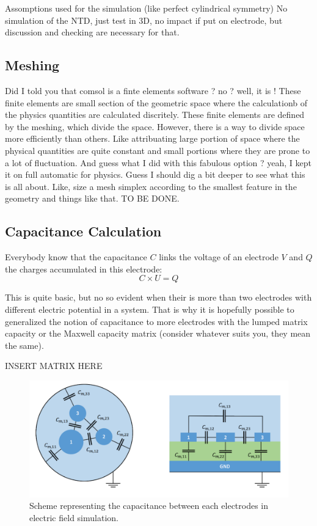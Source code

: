 Assomptions used for the simulation (like perfect cylindrical symmetry)
No simulation of the NTD, just test in 3D, no impact if put on electrode, but discussion and checking are necessary for that.

\subsection{Meshing}

Did I told you that comsol is a finte elements software ? no ? well, it is !
These finite elements are small section of the geometric space where the calculationb of the physics quantities are calculated discritely. These finite elements are defined by the meshing, which divide the space. However, there is a way to divide space more efficiently than others. Like attribuating large portion of space where the physical quantities are quite constant and small portions where they are prone to a lot of fluctuation.
And guess what I did with this fabulous option ?
yeah, I kept it on full automatic for physics. Guess I should dig a bit deeper to see what this is all about. Like, size a mesh simplex according to the smallest feature in the geometry and things like that.
TO BE DONE.

\subsection{Capacitance Calculation}

Everybody know that the capacitance $C$ links the voltage of an electrode $V$ and $Q$ the  charges accumulated in this electrode:
\begin{equation}
C \times U = Q
\end{equation}

This is quite basic, but no so evident when their is more than two electrodes with different electric potential in a system. That is why it is hopefully possible to generalized the notion of capacitance to more electrodes with the lumped matrix capacity or the Maxwell capacity matrix (consider whatever suits you, they mean the same).

INSERT MATRIX HERE

\begin{figure}
\centering
\includegraphics[width=\linewidth]{Figures/Electrodes/lumped_capacitance_scheme.png}
\caption{Scheme representing the capacitance between each electrodes in electric field simulation.}
\label{fig:lumped-capacitance}
\end{figure}

